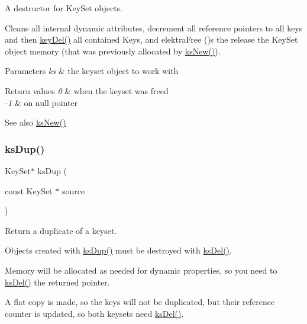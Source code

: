 A destructor for Key\+Set objects. 

Cleans all internal dynamic attributes, decrement all reference pointers to all keys and then \hyperlink{group__key_ga3df95bbc2494e3e6703ece5639be5bb1}{key\+Del()} all contained Keys, and elektra\+Free ()s the release the Key\+Set object memory (that was previously allocated by \hyperlink{group__keyset_ga671e1aaee3ae9dc13b4834a4ddbd2c3c}{ks\+New()}).


\begin{DoxyParams}{Parameters}
{\em ks} & the keyset object to work with \\
\hline
\end{DoxyParams}

\begin{DoxyRetVals}{Return values}
{\em 0} & when the keyset was freed \\
\hline
{\em -\/1} & on null pointer \\
\hline
\end{DoxyRetVals}
\begin{DoxySeeAlso}{See also}
\hyperlink{group__keyset_ga671e1aaee3ae9dc13b4834a4ddbd2c3c}{ks\+New()} 
\end{DoxySeeAlso}
\mbox{\label{group__keyset_gac59e4b328245463f1451f68d5106151c}} 
\subsubsection{\texorpdfstring{ks\+Dup()}{ksDup()}}
{\footnotesize\ttfamily Key\+Set$\ast$ ks\+Dup (\begin{DoxyParamCaption}\item[{const Key\+Set $\ast$}]{source }\end{DoxyParamCaption})}



Return a duplicate of a keyset. 

Objects created with \hyperlink{group__keyset_gac59e4b328245463f1451f68d5106151c}{ks\+Dup()} must be destroyed with \hyperlink{group__keyset_ga27e5c16473b02a422238c8d970db7ac8}{ks\+Del()}.

Memory will be allocated as needed for dynamic properties, so you need to \hyperlink{group__keyset_ga27e5c16473b02a422238c8d970db7ac8}{ks\+Del()} the returned pointer.

A flat copy is made, so the keys will not be duplicated, but their reference counter is updated, so both keysets need \hyperlink{group__keyset_ga27e5c16473b02a422238c8d970db7ac8}{ks\+Del()}.


